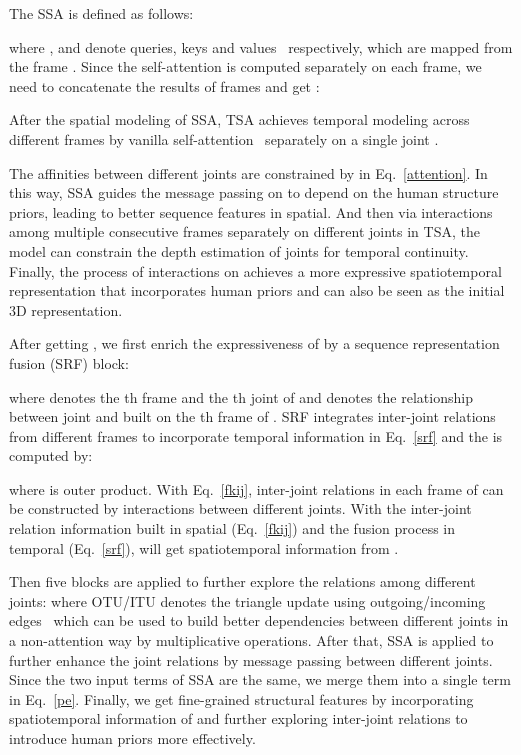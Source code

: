 \documentclass{article}
\begin{document}
The SSA is defined as follows:

where ,  and  
denote queries, keys and values~\cite{vaswani2017attention} respectively, which are mapped from the frame . Since the self-attention is computed separately on each frame, we need to concatenate the results of  frames and get :

After the spatial modeling of SSA, TSA achieves temporal modeling across different frames by vanilla self-attention~\cite{vaswani2017attention} separately on a single joint .

The affinities between different joints are constrained by  in Eq.~\ref{attention}. In this way, SSA guides the message passing on  to depend on the human structure priors, leading to better sequence features in spatial. And then via interactions among multiple consecutive frames separately on different joints in TSA, the model can constrain the depth estimation of joints for temporal continuity. Finally, the process of interactions on  achieves a more expressive spatiotemporal representation  that incorporates human priors and can also be seen as the initial 3D representation.

 After getting , we first enrich the expressiveness of  by a sequence representation fusion (SRF) block:


where  denotes the th frame and the th joint of  and  denotes the relationship between joint  and  built on the th frame of . 
SRF integrates inter-joint relations from different frames to incorporate temporal information in Eq.~\ref{srf} and the  is computed by:

where  is outer product. With Eq.~\ref{fkij}, inter-joint relations in each frame of  can be constructed by interactions between different joints. With the inter-joint relation information  built in spatial (Eq.~\ref{fkij}) and the fusion process in temporal (Eq.~\ref{srf}),  will get spatiotemporal information from .

Then five blocks are applied to further explore the relations among different joints:
where OTU/ITU denotes the triangle update using outgoing/incoming edges~\cite{jumper2021highly} which can be used to build better dependencies between different joints in a non-attention way by multiplicative operations. After that, SSA is applied to further enhance the joint relations by message passing between different joints. Since the two input terms of SSA are the same, we merge them into a single term in Eq.~\ref{pe}. Finally, we get fine-grained structural features  by incorporating spatiotemporal information of  and further exploring inter-joint relations to introduce human priors more effectively.\vspace{-0.3em}
\end{document}
